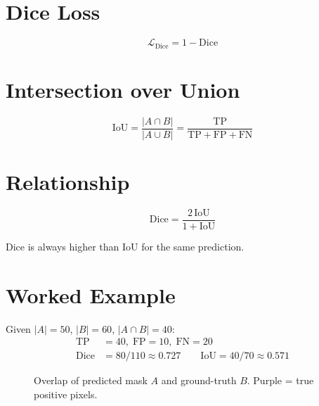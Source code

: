\documentclass[12pt,a4paper,openany]{report}
\begin{document}
\section{Dice Loss}

\begin{equation}
  \mathcal{L}_\text{Dice} = 1 - \text{Dice}
  \label{eq:diceloss}
\end{equation}

\section{Intersection over Union}

\begin{equation}
  \text{IoU} = \frac{|A\cap B|}{|A\cup B|}
             = \frac{\text{TP}}{\text{TP}+\text{FP}+\text{FN}}
  \label{eq:iou}
\end{equation}

\section{Relationship}

\begin{equation}
  \text{Dice} = \frac{2\,\text{IoU}}{1+\text{IoU}}
  \label{eq:dice_iou}
\end{equation}

Dice is always higher than IoU for the same prediction.

\section{Worked Example}

Given $|A|=50$, $|B|=60$, $|A\cap B|=40$:
\begin{align*}
  \text{TP}&=40,\;\text{FP}=10,\;\text{FN}=20\\
  \text{Dice}&=80/110\approx0.727\qquad
  \text{IoU}=40/70\approx0.571
\end{align*}

\begin{figure}[H]
\centering
{}
\caption{Overlap of predicted mask $A$ and ground-truth $B$. Purple = true positive pixels.}
\label{fig:overlap}
\end{figure}
\end{document}
